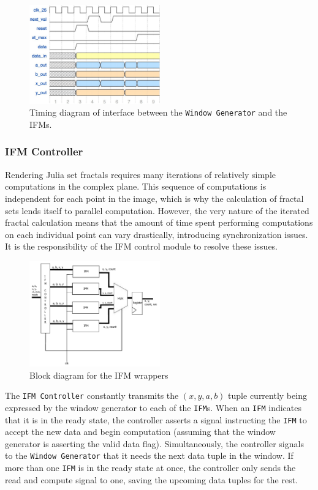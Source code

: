 \documentclass{article}
\begin{document}
\begin{figure}
  \centering
    \includegraphics[width=160pt]{timing_diagrams/gen_ifm.pdf}
  \caption{Timing diagram of interface between the \texttt{Window Generator}
    and the IFMs.}
\end{figure}

\subsubsection{IFM Controller}

Rendering Julia set fractals requires many iterations of relatively
simple computations in the complex plane. This sequence of
computations is independent for each point in the image, which is why
the calculation of fractal sets lends itself to parallel
computation. However, the very nature of the iterated fractal
calculation means that the amount of time spent performing computations on each individual point
can vary drastically, introducing synchronization issues. It is the responsibility of the
IFM control module to resolve these issues.

\begin{figure}
  \centering
    \includegraphics[width=160pt]{block_diagrams/ifmunit.pdf}
  \caption{Block diagram for the IFM wrappers}
\end{figure}


The \texttt{IFM Controller} constantly transmits the $(x, y, a, b)$ tuple currently being expressed by the window generator to each of the \texttt{IFM}s. When an \texttt{IFM} indicates that it is in the ready state, the controller asserts a signal instructing the 
\texttt{IFM} to accept the new data and begin computation (assuming that the window generator is asserting the valid data flag).
Simultaneously, the controller signals to the \texttt{Window Generator} that it needs the next data tuple in the window. If more
than one \texttt{IFM} is in the ready state at once, the controller only sends the read and compute signal to one, saving the upcoming data tuples for the rest.
\end{document}
